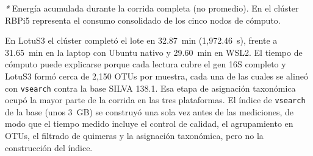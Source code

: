 \documentclass[12pt,oneside,spanish]{book}
\begin{document}
    \begin{table}[htbp]
    \centering
    \caption{Métricas de desempeño computacional y energético: LotuS3 Suite (5 muestras, 25,611 lecturas PacBio HiFi, protocolo 5~min de reposo basal).}
    \label{tab:desempeno_p2}
    \footnotesize
    \setlength{\tabcolsep}{4.5pt}

    \vspace{1.5mm}
    \parbox{\textwidth}{\raggedright \footnotesize \textit{*} Energía acumulada durante la corrida completa (no promedio). En el clúster RBPi5 representa el consumo consolidado de los cinco nodos de cómputo.}
    \end{table}

    
    En LotuS3 el clúster completó el lote en 32.87~min (1,972.46~s), frente a 31.65~min en la laptop con Ubuntu nativo y 29.60~min en WSL2. El tiempo de cómputo puede explicarse porque cada lectura cubre el gen 16S completo y LotuS3 formó cerca de 2,150 OTUs por muestra, cada una de las cuales se alineó con \texttt{vsearch} contra la base SILVA 138.1. Esa etapa de asignación taxonómica ocupó la mayor parte de la corrida en las tres plataformas. El índice de \texttt{vsearch} de la base (unos 3~GB) se construyó una sola vez antes de las mediciones, de modo que el tiempo medido incluye el control de calidad, el agrupamiento en OTUs, el filtrado de quimeras y la asignación taxonómica, pero no la construcción del índice.
    
\end{document}
